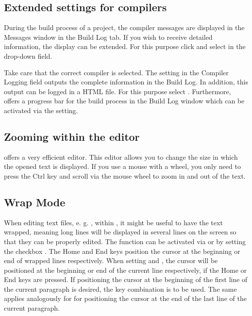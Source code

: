 \subsection{Extended settings for compilers}

During the build process of a project, the compiler messages are displayed in the Messages window in the Build Log tab. If you wish to receive detailed information, the display can be extended. For this purpose click  and select  in the drop-down field.


Take care that the correct compiler is selected. The  setting in the Compiler Logging field outputs the complete information in the Build Log. In addition, this output can be logged in a HTML file. For this purpose select .
Furthermore, \codeblocks offers a progress bar for the build process in the Build Log window which can be activated via the  setting.

\subsection{Zooming within the editor}

\codeblocks offers a very efficient editor. This editor allows you to change the size in which the opened text is displayed. If you use a mouse with a wheel, you only need to press the Ctrl key and scroll via the mouse wheel to zoom in and out of the text.


\subsection{Wrap Mode}

When editing text files, e. g. , within \codeblocks, it might be useful to have the text wrapped, meaning long lines will be displayed in several lines on the screen so that they can be properly edited. The  function can be activated via  or by setting the checkbox . The Home and End keys position the cursor at the beginning or end of wrapped lines respectively. When setting  and , the cursor will be positioned at the beginning or end of the current line respectively, if the Home or End keys are pressed. If positioning the cursor at the beginning of the first line of the current paragraph is desired, the key combination  is to be used. The same applies analogously for  for positioning the cursor at the end of the last line of the current paragraph.

